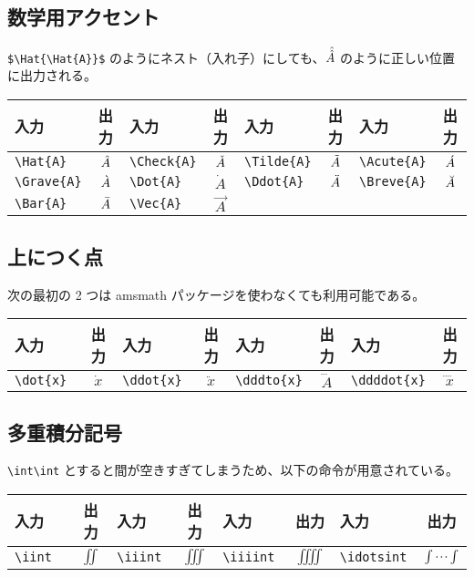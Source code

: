 \subsection{数学用アクセント}
\verb`$\Hat{\Hat{A}}$` のようにネスト（入れ子）にしても、$\Hat{\Hat{A}}$ のように正しい位置に出力される。
\begin{longtable}{@{}lclclclc@{}}
  入力             & 出力        & 入力             & 出力        & 入力             & 出力        & 入力             & 出力        \\ \toprule
  \verb`\Hat{A}`   & $\Hat{A}$   & \verb`\Check{A}` & $\Check{A}$ & \verb`\Tilde{A}` & $\Tilde{A}$ & \verb`\Acute{A}` & $\Acute{A}$ \\
  \verb`\Grave{A}` & $\Grave{A}$ & \verb`\Dot{A}`   & $\Dot{A}$   & \verb`\Ddot{A}`  & $\Ddot{A}$  & \verb`\Breve{A}` & $\Breve{A}$ \\
  \verb`\Bar{A}`   & $\Bar{A}$   & \verb`\Vec{A}`   & $\Vec{A}$   &                  &             &                  &             \\
\end{longtable}
\subsection{上につく点}
次の最初の 2 つは amsmath パッケージを使わなくても利用可能である。
\begin{longtable}{@{}lclclclc@{}}
  入力              & 出力      & 入力             & 出力       & 入力             & 出力        & 入力              & 出力         \\ \toprule
  \verb`\dot{x}   ` & $\dot{x}$ & \verb`\ddot{x}  `& $\ddot{x}$ & \verb`\dddto{x}` & $\dddot{A}$ & \verb`\ddddot{x}` & $\ddddot{x}$ \\
\end{longtable}
\subsection{多重積分記号}
\verb`\int\int` とすると間が空きすぎてしまうため、以下の命令が用意されている。
\begin{longtable}{@{}lclclclc@{}}
  入力              & 出力      & 入力            & 出力      & 入力              & 出力        & 入力              & 出力        \\ \toprule
  \verb`\iint     ` & $\iint$   & \verb`\iiint  ` & $\iiint$  & \verb`\iiiint  `  & $\iiiint$   & \verb`\idotsint ` & $\idotsint$ \\
\end{longtable}
